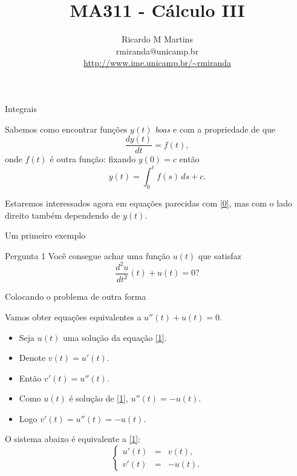\documentclass[11pt]{beamer}
\title{MA311 - Cálculo III}
\author{{Ricardo M Martins}\\ rmiranda@unicamp.br\\ 
\vspace{0.3cm}\url{http://www.ime.unicamp.br/~rmiranda}
}
\begin{document}
\begin{frame}{}
\maketitle
\end{frame}


\begin{frame}[t]{Integrais}

Sabemos como encontrar funções $y(t)$ {\it boas} e com a propriedade de que
\begin{equation}\label{0}\dfrac{dy(t)}{dt}=f(t),\end{equation} onde $f(t)$ é outra função: \pause fixando $y(0)=c$ então \[y(t)=\int_0^t f(s)\,ds+c.\] \pause 

Estaremos interessados agora em equações parecidas com \eqref{0}, mas com o lado direito também dependendo de $y(t)$.


\end{frame}




\begin{frame}{Um primeiro exemplo}

\begin{block}{Pergunta 1}
Você consegue achar uma função $u(t)$ que satisfaz 
\begin{equation}\label{1}
\dfrac{d^2u}{dt^2}(t)+u(t)=0?
\end{equation}
\end{block}

\end{frame}






\begin{frame}[t]{Colocando o problema de outra forma}

Vamos obter equações equivalentes a $u''(t)+u(t)=0$. \pause 

\begin{itemize}
\item Seja $u(t)$ uma solução da equação \eqref{1}. \pause 
\item Denote $v(t)=u'(t)$. \pause 
\item Então $v'(t)=u''(t)$. \pause 
\item Como $u(t)$ é solução de \eqref{1}, $u''(t)=-u(t)$. \pause 
\item Logo $v'(t)=u''(t)=-u(t)$. \pause 
\end{itemize}

O sistema abaixo é equivalente a \eqref{1}:
\begin{equation}\label{2}\left\{
\begin{array}{lcl}
u'(t)&=&v(t),\\
v'(t)&=&-u(t).
\end{array}
\right.
\end{equation}

\end{frame}
\end{document}

